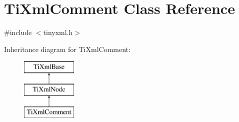\hypertarget{class_ti_xml_comment}{}\section{Ti\+Xml\+Comment Class Reference}
\label{class_ti_xml_comment}


{\ttfamily \#include $<$tinyxml.\+h$>$}

Inheritance diagram for Ti\+Xml\+Comment\+:\begin{figure}[H]
\begin{center}
\leavevmode
\includegraphics[height=3.000000cm]{class_ti_xml_comment}
\end{center}
\end{figure}

